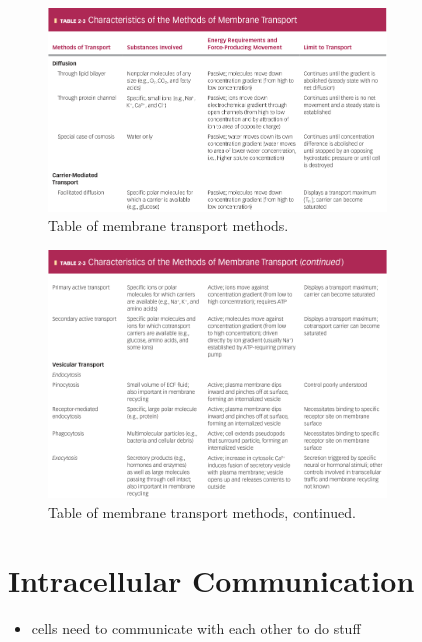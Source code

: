 \documentclass[10pt]{article}
\begin{document}
\begin{figure}[h]
    \centering
    \includegraphics[width=0.8\textwidth]{membraneTransportMethods1}
    \caption{Table of membrane transport methods.}
    \label{fig:membraneTransportMethods1}
\end{figure}
\begin{figure}[h]
    \centering
    \includegraphics[width=0.8\textwidth]{membraneTransportMethods2}
    \caption{Table of membrane transport methods, continued.}
    \label{fig:membraneTransportMethods2}
\end{figure}


\section{Intracellular Communication}
\begin{itemize}
    \item cells need to communicate with each other to do stuff
\end{itemize}
\end{document}
